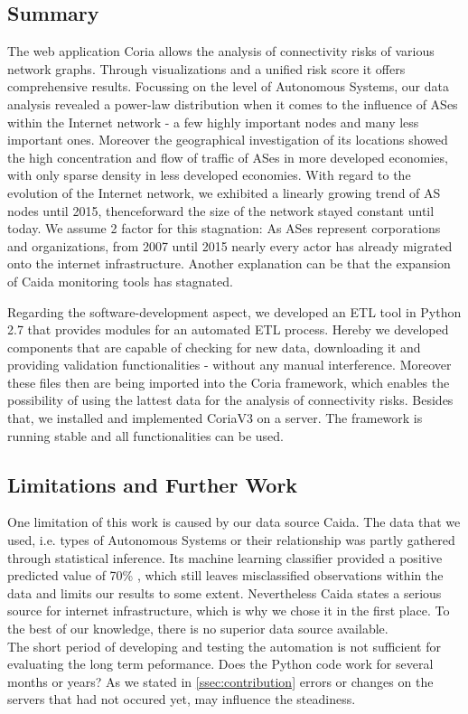 \documentclass[conference, 11pt]{IEEEtran}
\begin{document}
\subsection{Summary}

The web application Coria allows the analysis of connectivity risks of various network graphs. Through visualizations and a unified risk score it offers comprehensive results. Focussing on the level of Autonomous Systems, our data analysis revealed a power-law distribution when it comes to the influence of ASes within the Internet network - a few highly important nodes and many less important ones. Moreover the geographical investigation of its locations showed the high concentration and flow of traffic of ASes in more developed economies, with only sparse density in less developed economies. With regard to the evolution of the Internet network, we exhibited a linearly growing trend of AS nodes until 2015, thenceforward the size of the network stayed constant until today. We assume 2 factor for this stagnation: As ASes represent corporations and organizations, from 2007 until 2015 nearly every actor has already migrated onto the internet infrastructure. Another explanation can be that the expansion of Caida monitoring tools has stagnated.

Regarding the software-development aspect, we developed an ETL tool in Python 2.7 that provides modules for an automated ETL process. Hereby we developed components that are capable of checking for new data, downloading it and providing validation functionalities - without any manual interference. Moreover these files then are being imported into the Coria framework, which enables the possibility of using the lattest data for the analysis of connectivity risks. Besides that, we installed and implemented CoriaV3 on a server. The framework is running stable and all functionalities can be used. \\
 
\subsection{Limitations and Further Work}
One limitation of this work is caused by our data source Caida. The data that we used, i.e. types of Autonomous Systems or their relationship was partly gathered through statistical inference. Its machine learning classifier provided a positive predicted value of 70\% \cite{Classification}, which still leaves misclassified observations within the data and limits our results to some extent. Nevertheless Caida states a serious source for internet infrastructure, which is why we chose it in the first place. To the best of our knowledge, there is no superior data source available.  \\ 
The short period of developing and testing the automation is not sufficient for evaluating the long term peformance. Does the Python code work for several months or years? As we stated in \ref{ssec:contribution} errors or changes on the servers that had not occured yet, may influence the steadiness. \\
\end{document}
